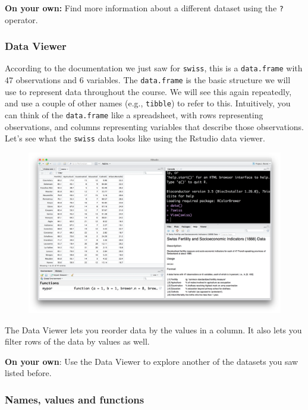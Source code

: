 \documentclass[]{article}
\theoremstyle{definition}
\theoremstyle{definition}
\theoremstyle{remark}
\begin{document}
\textbf{On your own:} Find more information about a different dataset
using the \texttt{?} operator.

\subsubsection{Data Viewer}\label{data-viewer}

According to the documentation we just saw for \texttt{swiss}, this is a
\texttt{data.frame} with 47 observations and 6 variables. The
\texttt{data.frame} is the basic structure we will use to represent data
throughout the course. We will see this again repeatedly, and use a
couple of other names (e.g., \texttt{tibble}) to refer to this.
Intuitively, you can think of the \texttt{data.frame} like a
spreadsheet, with rows representing observations, and columns
representing variables that describe those observations. Let's see what
the \texttt{swiss} data looks like using the Rstudio data viewer.

\begin{figure}[htbp]
\centering
\includegraphics{img/rstudio_view_swiss.png}
\caption{}
\end{figure}

The Data Viewer lets you reorder data by the values in a column. It also
lets you filter rows of the data by values as well.

\textbf{On your own}: Use the Data Viewer to explore another of the
datasets you saw listed before.

\subsubsection{Names, values and
functions}\label{names-values-and-functions}
\end{document}
